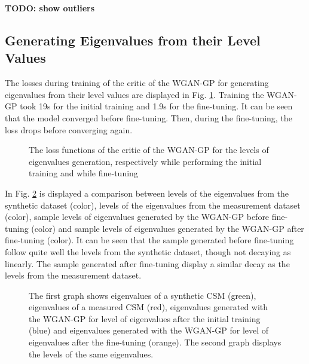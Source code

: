 \documentclass[11pt,a4paper,twoside]{report}
\begin{document}
\textbf{TODO: show outliers}

\subsection{Generating Eigenvalues from their Level Values}

The losses during training of the critic of the WGAN-GP for generating eigenvalues from their level values are displayed in Fig. \ref{fig:loss_evals_dB_wgangp}. Training the WGAN-GP took 19s for the initial training and 1.9s for the fine-tuning. It can be seen that the model converged before fine-tuning. Then, during the fine-tuning, the loss drops before converging again.

\begin{figure}
    \centering
    \caption{The loss functions of the critic of the WGAN-GP for the levels of eigenvalues generation, respectively while performing the initial training and while fine-tuning}
    \label{fig:loss_evals_dB_wgangp}
\end{figure}


In Fig. \ref{fig:samples_evals_dB_wgangp} is displayed a comparison between levels of the eigenvalues from the synthetic dataset (color), levels of the eigenvalues from the measurement dataset (color), sample levels of eigenvalues generated by the WGAN-GP before fine-tuning (color) and sample levels of eigenvalues generated by the WGAN-GP after fine-tuning (color). It can be seen that the sample generated before fine-tuning follow quite well the levels from the synthetic dataset, though not decaying as linearly. The sample generated after fine-tuning display a similar decay as the levels from the measurement dataset.

\begin{figure}
    \centering
    \caption{The first graph shows eigenvalues of a synthetic CSM (green), eigenvalues of a measured CSM (red), eigenvalues generated with the WGAN-GP for level of eigenvalues after the initial training (blue) and eigenvalues generated with the WGAN-GP for level of eigenvalues after the fine-tuning (orange). The second graph displays the levels of the same eigenvalues.}
    \label{fig:samples_evals_dB_wgangp}
\end{figure}
\end{document}
